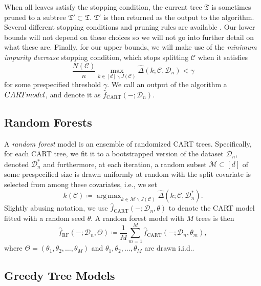 \documentclass[11pt]{article}
\DeclareMathOperator*{\argmax}{arg\,max}
\newcommand{\tree}{\mathfrak{T}}
\newcommand{\cell}{\mathcal{C}}
\newcommand{\nfeats}{d}
\newcommand{\nsamples}{n}
\newcommand{\coordindices}{[\nfeats]}
\newcommand{\data}[1][n]{\mathcal{D}_{#1}}
\newcommand{\cellfeatindices}{J}
\newcommand{\frf}{\hat{f}_{\operatorname{RF}}}
\newcommand{\fcart}{\hat{f}_{\operatorname{CART}}}
\newcommand{\splitfeature}{k}
\newcommand{\mtryset}{\mathcal{M}}
\begin{document}
When all leaves satisfy the stopping condition, the current tree $\tree$ is sometimes pruned to a subtree $\tree' \subset \tree$.
$\tree'$ is then returned as the output to the algorithm.
Several different stopping conditions and pruning rules are available \citep{breiman1984classification,pedregosa2011scikit}.
Our lower bounds will not depend on these choices so we will not go into further detail on what these are.
Finally, for our upper bounds, we will make use of the \emph{minimum impurity decrease} stopping condition, which stops splitting $\cell$ when it satisfies
\begin{equation}
\label{eq:min_imp_dec}
    \frac{N(\cell)}{\nsamples}\max_{k \in \coordindices\backslash\cellfeatindices(\cell)}\hat\Delta(k; \cell, \data) < \gamma
\end{equation}
for some prespecified threshold $\gamma$.
We call an output of the algorithm a $\emph{CART model}$, and denote it as $\fcart(-;\data)$.

\subsection{Random Forests}

A \emph{random forest} model is an ensemble of randomized CART trees.
Specifically, for each CART tree, we fit it to a bootstrapped version of the dataset $\data$, denoted $\data^*$ and furthermore, at each iteration, a random subset $\mtryset \subset \coordindices$ of some prespecified size is drawn uniformly at random with the split covariate is selected from among these covariates, i.e., we set \begin{equation}
    \splitfeature(\cell) \coloneqq \argmax_{k \in \mtryset\backslash\cellfeatindices(\cell)} \hat\Delta(k;\cell,\data^*).
\end{equation}
Slightly abusing notation, we use
$\fcart(-;\data,\theta)$ to denote the CART model fitted with a random seed $\theta$.
A random forest model with $M$ trees is then
\begin{equation}
    \frf(-;\data,\Theta) \coloneqq \frac{1}{M} \sum_{m=1}^M \fcart(-;\data,\theta_m),
\end{equation}
where $\Theta = (\theta_1,\theta_2,\ldots,\theta_M)$ and $\theta_1,\theta_2,\ldots,\theta_M$ are drawn i.i.d..

\subsection{Greedy Tree Models}
\end{document}
